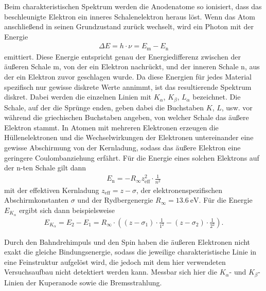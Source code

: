 \noindent
Beim charakteristischen Spektrum werden die Anodenatome so ionisiert, dass das beschleunigte Elektron 
ein inneres Schalenelektron heraus löst. 
Wenn das Atom anschließend in seinen Grundzustand zurück wechselt, wird ein Photon mit der Energie 
\begin{align}
    \Delta E = h \cdot \nu = E_\text{m} - E_\text{n}
    \label{eq:energiedifferenz}
\end{align}
emittiert.
Diese Energie entspricht genau der Energiedifferenz zwischen der äußeren Schale m, von der ein Elektron nachrückt, und der inneren Schale n,
aus der ein Elektron zuvor geschlagen wurde. 
Da diese Energien für jedes Material spezifisch nur gewisse diskrete Werte annimmt, ist das resultierende Spektrum diskret.
Dabei werden die einzelnen Linien mit $K_\alpha$, $K_\beta$, $L_\alpha$ bezeichnet.
Die Schale, auf der die Sprünge enden, geben dabei die Buchstaben $K$, $L$, usw. vor während die griechischen Buchstaben angeben, von welcher Schale das 
äußere Elektron stammt.
In Atomen mit mehreren Elektronen erzeugen die Hüllenelektronen und die Wechselwirkungen der Elektronen untereinander eine gewisse Abschirmung von der Kernladung,
sodass das äußere Elektron eine geringere Coulombanziehung erfährt.
Für die Energie eines solchen Elektrons auf der n-ten Schale gilt dann
\begin{align}
    E_\text{n} = - R_\infty z_\text{eff}^2 \cdot \frac{1}{n^2}
    \label{eq:effektive_energie}
\end{align}
mit der effektiven Kernladung $z_\text{eff} = z - \sigma$, der elektronenspezifischen Abschirmkonstanten $\sigma$ und der Rydbergenergie $R_\infty = \qty[]{13.6}{\electronvolt}$.
Für die Energie $E_{K_\alpha}$ ergibt sich dann beispielsweise
\begin{align}
    E_{K_\alpha} = E_2 - E_1 = R_\infty \cdot \left(\left(z-\sigma_1\right) \cdot \frac{1}{1^2} - \left(z-\sigma_2\right) \cdot \frac{1}{2^2}\right).
    \label{eq:k_alpha}
\end{align}

\noindent
Durch den Bahndrehimpuls und den Spin haben die äußeren Elektronen nicht exakt die gleiche Bindungsenergie, sodass die jeweilige charakteristische Linie in eine
Feinstruktur aufgelöst wird, die jedoch mit dem hier verwendeten Versuchsaufbau nicht detektiert werden kann.
Messbar sich hier die $K_\alpha$- und $K_\beta$-Linien der Kuperanode sowie die Bremsstrahlung.





